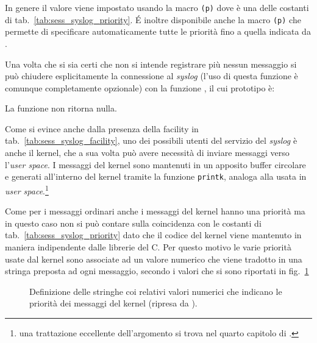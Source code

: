 In genere il valore viene impostato usando la macro
\texttt{(p)} dove  è una delle costanti di
tab.~\ref{tab:sess_syslog_priority}. É inoltre disponibile anche la macro
\texttt{(p)} che permette di specificare automaticamente
tutte le priorità fino a quella indicata da .

Una volta che si sia certi che non si intende registrare più nessun messaggio
si può chiudere esplicitamente la connessione al \textit{syslog} (l'uso di
questa funzione è comunque completamente opzionale) con la funzione
, il cui prototipo è:

\begin{funcproto}{
}

{La funzione non ritorna nulla.}
\end{funcproto}


Come si evince anche dalla presenza della facility  in
tab.~\ref{tab:sess_syslog_facility}, uno dei possibili utenti del servizio del
\textit{syslog} è anche il kernel, che a sua volta può avere necessità di
inviare messaggi verso l'\textit{user space}. I messaggi del kernel sono
mantenuti in un apposito buffer circolare e generati all'interno del kernel
tramite la funzione \texttt{printk}, analoga alla  usata in
\textit{user space}.\footnote{una trattazione eccellente dell'argomento si
  trova nel quarto capitolo di \cite{LinDevDri}.}

Come per i messaggi ordinari anche i messaggi del kernel hanno una priorità ma
in questo caso non si può contare sulla coincidenza con le costanti di
tab.~\ref{tab:sess_syslog_priority} dato che il codice del kernel viene
mantenuto in maniera indipendente dalle librerie del C. Per questo motivo le
varie priorità usate dal kernel sono associate ad un valore numerico che viene
tradotto in una stringa preposta ad ogni messaggio, secondo i valori che si
sono riportati in fig.~\ref{fig:printk_priority}

\begin{figure}[!htb]
  \footnotesize \centering
  \begin{minipage}[c]{0.80\textwidth}
  \end{minipage} 
  \normalsize 
  \caption{Definizione delle stringhe coi relativi valori numerici che
    indicano le priorità dei messaggi del kernel (ripresa da
    ).}
  \label{fig:printk_priority}
\end{figure}

